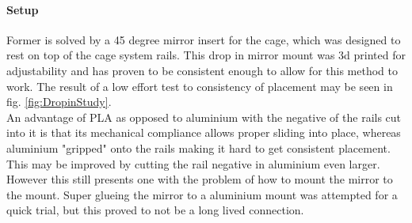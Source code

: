 \documentclass[twoside,openright]{scrreprt}
\begin{document}
\paragraph{Setup}
Former is solved by a 45 degree mirror insert for the cage, which was designed to rest on top of the cage system rails. This drop in mirror mount was 3d printed for adjustability and has proven to be consistent enough to allow for this method to work. The result of a low effort test to consistency of placement may be seen in fig. \ref{fig:DropinStudy}. \\
An advantage of PLA as opposed to aluminium with the negative of the rails cut into it is that its mechanical compliance allows proper sliding into place, whereas aluminium "gripped" onto the rails making it hard to get consistent placement. This may be improved by cutting the rail negative in aluminium even larger. However this still presents one with the problem of how to mount the mirror to the mount. Super glueing  the mirror to a aluminium mount was attempted for a quick trial, but this proved to not be a long lived connection.\\
\end{document}
